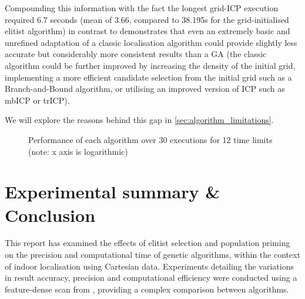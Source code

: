 \documentclass[authoryearcitations]{UoYCSproject}
\begin{document}
Compounding this information with the fact the longest grid-ICP execution required 6.7 seconds (mean of 3.66, compared to 38.195s for the grid-initialised elitist algorithm) in contrast to  demonstrates that even an extremely basic and unrefined adaptation of a classic localisation algorithm could provide slightly less accurate but considerably more consistent results than a GA (the classic algorithm could be further improved by increasing the density of the initial grid, implementing a more efficient candidate selection from the initial grid such as a Branch-and-Bound algorithm, or utilising an improved version of ICP such as mbICP or trICP).

We will explore the reasons behind this gap in \autoref{sec:algorithm_limitations}.


\begin{figure}
	\caption[Grid-ICP performance against Grid-Initialised GA] {Performance of each algorithm over 30 executions for 12 time limits (note: x axis is logarithmic)}
	\label{fig:icp_vs_grid_box_whiskers}
\end{figure}



\chapter{Experimental summary \& Conclusion}
This report has examined the effects of elitist selection and population priming on the precision and computational time of genetic algorithms, within the context of indoor localisation using Cartesian data. Experiments detailing the variations in result accuracy, precision and computational efficiency were conducted using a feature-dense scan from \citet{Lenac2011-co}, providing a complex comparison between algorithms.
\end{document}
